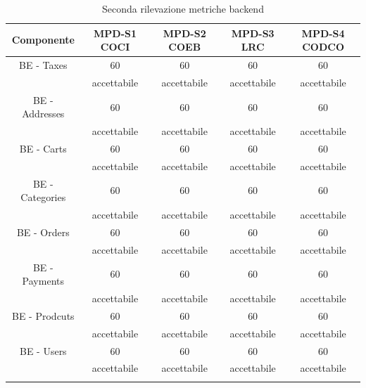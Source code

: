 \begin{center}
    \begin{longtable}{|c|c|c|c|c|}
        \hline
        \rowcolor{lighter-grayer}
        \textbf{Componente}         & \textbf{MPD-S1 COCI}  & \textbf{MPD-S2 COEB} & \textbf{MPD-S3 LRC} & \textbf{MPD-S4 CODCO}\\
        \hline
        \endfirsthead

        \hline
        BE - Taxes & 60 & 60  & 60 & 60                       \\
        & accettabile & accettabile  & accettabile & accettabile                       \\
        BE - Addresses & 60 & 60  & 60 & 60                       \\
        & accettabile & accettabile  & accettabile & accettabile                       \\
        BE - Carts & 60 & 60  & 60 & 60                       \\
        & accettabile & accettabile  & accettabile & accettabile                       \\
        BE - Categories & 60 & 60  & 60 & 60                       \\
        & accettabile & accettabile  & accettabile & accettabile                       \\
        BE - Orders & 60 & 60  & 60 & 60                       \\
        & accettabile & accettabile  & accettabile & accettabile                       \\
        BE - Payments & 60 & 60  & 60 & 60                       \\
        & accettabile & accettabile  & accettabile & accettabile                       \\
        BE - Prodcuts & 60 & 60  & 60 & 60                       \\
        & accettabile & accettabile  & accettabile & accettabile                       \\
        BE - Users & 60 & 60  & 60 & 60                       \\
        & accettabile & accettabile  & accettabile & accettabile                       \\

        \hline
        \rowcolor{white}
        \caption{Seconda rilevazione metriche backend}
    \end{longtable}

    
\end{center}

